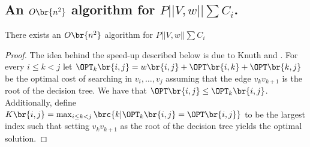 \subsection{An $O\br{n^2}$ algorithm for $P||V, w||\sum C_i$.}
\begin{theorem}
    There exists an $O\br{n^2}$ algorithm for $P||V, w||\sum C_i$
    \begin{proof}
        
The idea behind the speed-up described below is due to Knuth \cite{Knuth1973} and \cite{EffDPusingQI}. For every $i\leq k< j$ let $\OPT_k\br{i,j} = w\br{i,j} + \OPT\br{i, k} + \OPT\br{k, j}$ be the optimal cost of searching in $v_i,\dots,v_j$ assuming that the edge $v_kv_{k+1}$ is the root of the decision tree. We have that $\OPT\br{i,j}\leq \OPT_k\br{i,j}$. Additionally, define 
$K\br{i,j} = \max_{i\leq k< j}\brc{k|\OPT_k\br{i,j}=\OPT\br{i,j}}$ to be the largest index such that setting $v_kv_{k+1}$ as the root of the decision tree yields the optimal solution. 


\end{proof}
\end{theorem}
